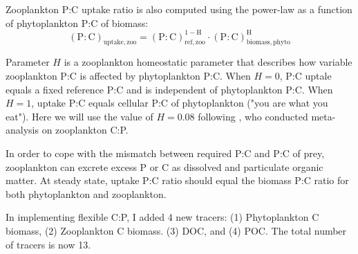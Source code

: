 \documentclass[a4paper]{article}
\begin{document}
Zooplankton P:C uptake ratio is also computed using the power-law as a function of phytoplankton P:C of biomass:
\begin{equation}
   \mathrm{(P:C)_{uptake,zoo}} = \mathrm{(P:C)_{ref,zoo}^{1-H}\cdot (P:C)_{biomass,phyto}^{H}} \label{eq:eq_pczoo}
\end{equation}

Parameter $H$ is a zooplankton homeostatic parameter that describes how variable zooplankton P:C is affected by phytoplankton P:C. When $H = 0$, P:C uptale equals a fixed reference P:C and is independent of phytoplankton P:C. When $H = 1$, uptake P:C equals cellular P:C of phytoplankton ("you are what you eat"). Here we will use the value of $H = 0.08$ following \cite{Persson10}, who conducted meta-analysis on zooplankton C:P.

In order to cope with the mismatch between required P:C and P:C of prey, zooplankton can excrete excess P or C as dissolved and particulate organic matter. At steady state, uptake P:C ratio should equal the biomass P:C ratio for both phytoplankton and zooplankton.

In implementing flexible C:P, I added 4 new tracers: (1) Phytoplankton C biomass, (2) Zooplankton C biomass. (3) DOC, and (4) POC. The total number of tracers is now 13. 
\end{document}
